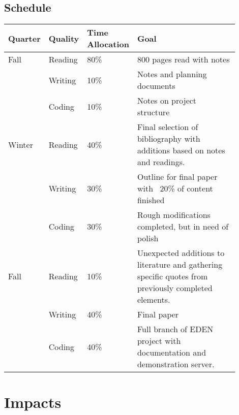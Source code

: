\documentclass[a4paper,man,natbib]{apa6}
\begin{document}
   \subsection*{Schedule}
   \begin{center}
   \begin{tabular}{|l|p{0.1\linewidth}|p{0.1\linewidth}|p{0.7\linewidth}|}
   \hline
   Quarter & Quality & Time Allocation & Goal                         \\ \hline
   Fall    & Reading & 80\%            & 800 pages read with notes    \\ \cline{2-4} 
           & Writing & 10\%            & Notes and planning documents \\ \cline{2-4} 
           & Coding  & 10\%            & Notes on project structure   \\ \hline 
   Winter  & Reading & 40\%            & Final selection of bibliography with additions based on notes and readings.   \\ \cline{2-4} 
           & Writing & 30\%            & Outline for final paper with ~20\% of content finished \\ \cline{2-4} 
           & Coding  & 30\%            & Rough modifications completed, but in need of polish  \\ \hline
   Fall    & Reading & 10\%            & Unexpected additions to literature and gathering specific quotes from previously completed elements.   \\ \cline{2-4} 
           & Writing & 40\%            & Final paper \\ \cline{2-4}
           & Coding  & 40\%            & Full branch of EDEN project with documentation and demonstration server. \\ \hline
   \end{tabular}
   \end{center}
   \section*{Impacts}
\end{document}
